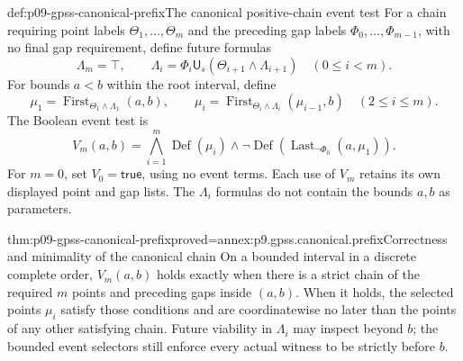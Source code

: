 \begin{hbdefinition}{def:p09-gpss-canonical-prefix}{The canonical positive-chain event test}
For a chain requiring point labels \(\Theta_1,\ldots,\Theta_m\)
and the preceding gap labels \(\Phi_0,\ldots,\Phi_{m-1}\),
with no final gap requirement, define future formulas
\[
 \Lambda_m=\top,\qquad
 \Lambda_i=\Phi_i\mathbin{\mathsf U_s}
                   (\Theta_{i+1}\land\Lambda_{i+1})
                       \quad(0\leq i<m).
\]
For bounds \(a<b\) within the root interval, define
\[
 \mu_1=\operatorname{First}_{\Theta_1\land\Lambda_1}(a,b),\qquad
 \mu_i=\operatorname{First}_{\Theta_i\land\Lambda_i}(\mu_{i-1},b)
                       \quad(2\leq i\leq m).
\]
The Boolean event test is
\[
 V_m(a,b)=
   \bigwedge_{i=1}^{m}\operatorname{Def}(\mu_i)
   \land\neg\operatorname{Def}
          (\operatorname{Last}_{\neg\Phi_0}(a,\mu_1)).
\]
For \(m=0\), set \(V_0=\mathsf{true}\), using no event
terms. Each use of \(V_m\) retains its own displayed point and
gap lists. The \(\Lambda_i\) formulas do not contain the
bounds \(a,b\) as parameters.
\end{hbdefinition}

\begin{hblemma}{thm:p09-gpss-canonical-prefix}{proved=annex:p9.gpss.canonical.prefix}{Correctness and minimality of the canonical chain}
On a bounded interval in a discrete complete order, \(V_m(a,b)\)
holds exactly when there is a strict chain of the required \(m\)
points and preceding gaps inside \((a,b)\). When it holds,
the selected points \(\mu_i\) satisfy those conditions and are
coordinatewise no later than the points of any other satisfying
chain. Future viability in \(\Lambda_i\) may inspect beyond
\(b\); the bounded event selectors still enforce every actual
witness to be strictly before \(b\).
\end{hblemma}

